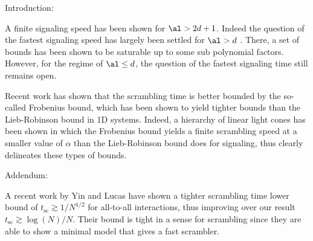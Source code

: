 Introduction:

A finite signaling speed has been shown for $\al > 2d+1$. Indeed the question of the fastest signaling speed has largely been settled for $\al > d$ \cite{Tran...}. There, a set of bounds has been shown to be saturable up to some sub polynomial factors. However, for the regime of $\al \le d$, the question of the fastest signaling time still remains open.

Recent work has shown that the scrambling time is better bounded by the so-called Frobenius bound, which has been shown to yield tighter bounds than the Lieb-Robinson bound in 1D systems. Indeed, a hierarchy of linear light cones has been shown in which the Frobenius bound yields a finite scrambling speed at a smaller value of $\alpha$ than the Lieb-Robinson bound does for signaling, thus clearly delineates these types of bounds.

Addendum:

A recent work by Yin and Lucas have shown a tighter scrambling time lower bound of $t_{\text{sc}}\gtrsim 1/N^{1/2}$ for all-to-all interactions, thus improving over our result $t_{\text{sc}}\gtrsim \log(N)/N$. Their bound is tight in a sense for scrambling since they are able to show a minimal model that gives a fast scrambler.
